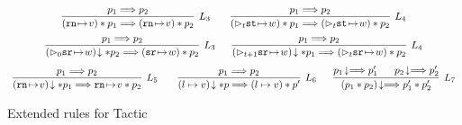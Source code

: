 \begin{figure}[!t]
    \small
    \[
        \begin{array}{c}
            \infer[L_3]
            {
                (\regst{\regN}{\val}) \sepstar \astP_1 \Longrightarrow 
                (\regst{\regN}{\val}) \sepstar \astP_2
            }
            {
                \astP_1 \Longrightarrow \astP_2
            } \qquad 
            \infer[L_4]
            {
                (\dlyregst{t}{\st}{\word}) \sepstar \astP_1 \Longrightarrow 
                (\dlyregst{t}{\st}{\word}) \sepstar \astP_2
            }
            {
                \astP_1 \Longrightarrow \astP_2
            } \\
            \\[-5pt]
            \infer[L_3]
            {
                \nxtAst{(\dlyregst{0}{\sr}{\word})} \sepstar \astP_2 \Longrightarrow 
                (\regst{\sr}{\word}) \sepstar \astP_2
            }
            {
                \astP_1 \Longrightarrow \astP_2
            } \quad \ \ 
            \infer[L_4]
            {
                \nxtAst{(\dlyregst{t+1}{\sr}{\word})} \sepstar \astP_1 \Longrightarrow 
                (\dlyregst{t}{\sr}{\word}) \sepstar \astP_2
            }
            {
                \astP_1 \Longrightarrow \astP_2
            } \\
            \\[-5pt]
            \infer[L_5]
            {
                \nxtAst{(\regst{\regN}{\val})} \sepstar \astP_1 \Longrightarrow 
                \regst{\regN}{\val} \sepstar \astP_2
            }
            {
                \astP_1 \Longrightarrow \astP_2
            } \qquad 
            \infer[L_6]
            {
                \nxtAst{(\sepsto{\loc}{\val})} \sepstar \astP \Longrightarrow 
                (\sepsto{\loc}{\val}) \sepstar \astP'
            }
            {
                \astP_1 \Longrightarrow \astP_2
            } \quad \ \
            \infer[L_7]
            {
                \nxtAst{(\astP_1 \sepstar \astP_2)}
                \Longrightarrow 
                \astP_1' \sepstar \astP_2'
            }
            {
                \nxtAst{\astP_1} \Longrightarrow \astP_1' \quad \ \ 
                \nxtAst{\astP_2} \Longrightarrow \astP_2'
            } 
        \end{array}
    \]
    \caption{Extended rules for Tactic \sepcancel{}}
    \label{fig:ext-rule-tac-sepcancel}
\end{figure}
